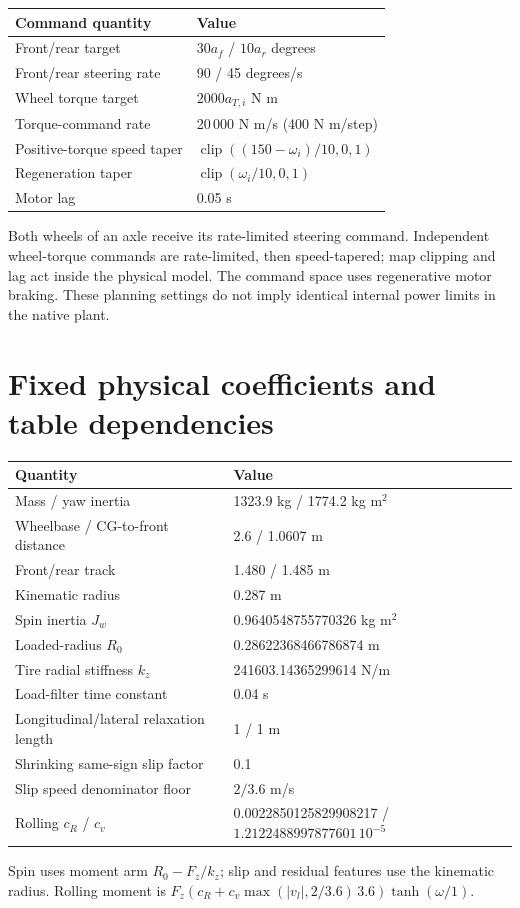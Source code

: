 \documentclass[11pt]{article}
\begin{document}
\begin{center}
\begin{tabular}{ll}
\toprule Command quantity & Value\\\midrule
Front/rear target & $30a_f$ / $10a_r$ degrees\\
Front/rear steering rate & 90 / 45 degrees/s\\
Wheel torque target & $2000a_{T,i}$ N m\\
Torque-command rate & 20\,000 N m/s (400 N m/step)\\
Positive-torque speed taper & $\operatorname{clip}((150-\omega_i)/10,0,1)$\\
Regeneration taper & $\operatorname{clip}(\omega_i/10,0,1)$\\
Motor lag & 0.05 s\\\bottomrule
\end{tabular}
\end{center}
Both wheels of an axle receive its rate-limited steering command. Independent wheel-torque commands are rate-limited, then speed-tapered; map clipping and lag act inside the physical model. The command space uses regenerative motor braking. These planning settings do not imply identical internal power limits in the native plant.

\section{Fixed physical coefficients and table dependencies}
\begin{center}
\begin{tabular}{ll}
\toprule Quantity & Value\\\midrule
Mass / yaw inertia & 1323.9 kg / 1774.2 kg m$^2$\\
Wheelbase / CG-to-front distance & 2.6 / 1.0607 m\\
Front/rear track & 1.480 / 1.485 m\\
Kinematic radius & 0.287 m\\
Spin inertia $J_w$ & 0.9640548755770326 kg m$^2$\\
Loaded-radius $R_0$ & 0.28622368466786874 m\\
Tire radial stiffness $k_z$ & 241603.14365299614 N/m\\
Load-filter time constant & 0.04 s\\
Longitudinal/lateral relaxation length & 1 / 1 m\\
Shrinking same-sign slip factor & 0.1\\
Slip speed denominator floor & $2/3.6$ m/s\\
Rolling $c_R$ / $c_v$ & 0.0022850125829908217 / $1.2122488997877601\,10^{-5}$\\\bottomrule
\end{tabular}
\end{center}
Spin uses moment arm $R_0-F_z/k_z$; slip and residual features use the kinematic radius. Rolling moment is $F_z(c_R+c_v\max(|v_l|,2/3.6)\,3.6)\tanh(\omega/1)$.
\end{document}
